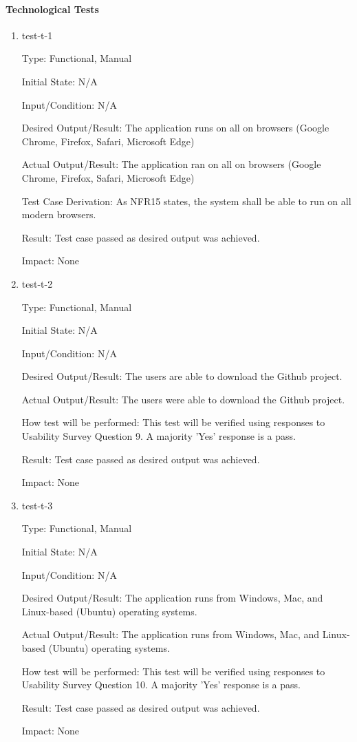 \documentclass[12pt, titlepage]{article}
\begin{document}
\paragraph{Technological Tests}

\begin{enumerate}

\item{test-t-1\\}

Type: Functional, Manual		

Initial State: N/A	

Input/Condition: N/A		

Desired Output/Result: The application runs on all on browsers (Google Chrome, Firefox, Safari, Microsoft Edge)

Actual Output/Result: The application ran on all on browsers (Google Chrome, Firefox, Safari, Microsoft Edge)

Test Case Derivation: As NFR15 states, the system shall be able to run on all modern browsers.

Result: Test case passed as desired output was achieved.

Impact: None

\item{test-t-2\\}

Type: Functional, Manual

Initial State: N/A

Input/Condition: N/A

Desired Output/Result: The users are able to download the Github project.

Actual Output/Result: The users were able to download the Github project.

How test will be performed: This test will be verified using responses to Usability Survey Question 9. A majority 'Yes' response is a pass.

Result: Test case passed as desired output was achieved.

Impact: None

\item{test-t-3\\}

Type: Functional, Manual

Initial State: N/A

Input/Condition: N/A		

Desired Output/Result: The application runs from Windows, Mac, and Linux-based (Ubuntu) operating systems.	

Actual Output/Result: The application runs from Windows, Mac, and Linux-based (Ubuntu) operating systems.

How test will be performed: This test will be verified using responses to Usability Survey Question 10. A majority 'Yes' response is a pass.

Result: Test case passed as desired output was achieved.

Impact: None

\end{enumerate}
\end{document}

